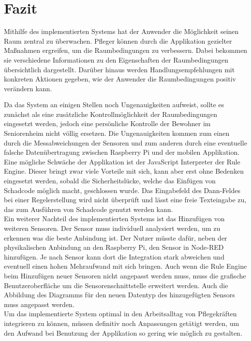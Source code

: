 \chapter{Fazit}

Mithilfe des implementierten Systems hat der Anwender die Möglichkeit seinen Raum zentral zu überwachen. Pfleger können durch die Applikation gezielter Maßnahmen ergreifen, um die Raumbedingungen zu verbessern. Dabei bekommen sie verschiedene Informationen zu den Eigenschaften der Raumbedingungen übersichtlich dargestellt. Darüber hinaus werden Handlungsempfehlungen mit konkreten Aktionen gegeben, wie der Anwender die Raumbedingungen positiv verändern kann. 
 
Da das System an einigen Stellen noch Ungenauigkeiten aufweist, sollte es zunächst als eine zusätzliche Kontrollmöglichkeit der Raumbedingungen eingesetzt werden, jedoch eine persönliche Kontrolle der Bewohner im Seniorenheim nicht völlig ersetzen. Die Ungenauigkeiten kommen zum einen durch die Messabweichungen der Sensoren und zum anderen durch eine eventuelle falsche Datenübertragung zwischen Raspberry Pi und der mobilen Applikation. \\
Eine mögliche Schwäche der Applikation ist der JavaScript Interpreter der Rule Engine. Dieser bringt zwar viele Vorteile mit sich, kann aber erst ohne Bedenken eingesetzt werden, sobald die Sicherheitslücke, welche das Einfügen von Schadcode möglich macht, geschlossen wurde. Das Eingabefeld des Dann-Feldes bei einer Regelerstellung wird nicht überprüft und lässt eine freie Texteingabe zu, das zum Ausführen von Schadcode genutzt werden kann.\\
Ein weiterer Nachteil des implementierten Systems ist das Hinzufügen von weiteren Sensoren. Der Sensor muss individuell analysiert werden, um zu erkennen was die beste Anbindung ist. Der Nutzer müsste dafür, neben der physikalischen Anbindung an den Raspberry Pi, den Sensor in Node-RED hinzufügen. Je nach Sensor kann dort die Integration stark abweichen und eventuell einen hohen Mehraufwand mit sich bringen. Auch wenn die Rule Engine beim Hinzufügen neuer Sensoren nicht angepasst werden muss, muss die grafische Benutzeroberfläche um die Sensorenschnittstelle erweitert werden. Auch die Abbildung des Diagramms für den neuen Datentyp des hinzugefügten Sensors muss angepasst werden.\\
Um das implementierte System optimal in den Arbeitsalltag von Pflegekräften integrieren zu können, müssen definitiv noch Anpassungen getätigt werden, um den Aufwand bei Benutzung der Applikation so gering wie möglich zu gestalten. 
